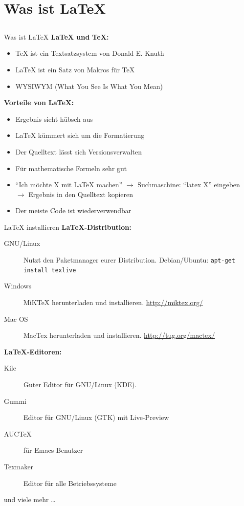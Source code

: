 \documentclass{beamer}
\newcommand{\slideheading}[1]{\textbf{#1}\\}
\begin{document}
		
	\section{Was ist \LaTeX{}}
		\subsection*{}
		\begin{frame}{Was ist \LaTeX{}}
			\slideheading{\LaTeX{} und \TeX{}:}
			\begin{itemize}
				\item \TeX{} ist ein Textsatzsystem von Donald E. Knuth
				\item \LaTeX{} ist ein Satz von Makros für \TeX
				\item WYSIWYM (What You See Is What You Mean)
			\end{itemize}
			\vspace{0.2cm}
			\slideheading{Vorteile von \LaTeX{}:}
			\begin{itemize}
				\item Ergebnis sieht hübsch aus
				\item \LaTeX{} kümmert sich um die Formatierung
				\item Der Quelltext lässt sich Versionsverwalten
				\item Für mathematische Formeln sehr gut
				\item ``Ich möchte X mit \LaTeX{} machen'' $\rightarrow$
				Suchmaschine: ``latex X'' eingeben $\rightarrow$
				Ergebnis in den Quelltext kopieren
				\item Der meiste Code ist wiederverwendbar
			\end{itemize}
		\end{frame}
		
		
		\begin{frame}{\LaTeX{} installieren}
			\slideheading{\LaTeX-Distribution:}
			\begin{description}
				\item[GNU/Linux] Nutzt den Paketmanager eurer Distribution. Debian/Ubuntu: \texttt{apt-get install texlive} 
				\item[Windows] MiKTeX herunterladen und installieren. \url{http://miktex.org/}
				\item[Mac OS] MacTex herunterladen und installieren. \url{http://tug.org/mactex/} 
			\end{description}
			\slideheading{\LaTeX-Editoren:}
			\begin{description}
				\item[Kile] Guter Editor für GNU/Linux (KDE).
				\item[Gummi] Editor für GNU/Linux (GTK) mit Live-Preview
				\item[AUCTeX] für Emacs-Benutzer
				\item[Texmaker] Editor für alle Betriebssysteme
			\end{description}
			 und viele mehr \dots
		\end{frame}
		
\end{document}

